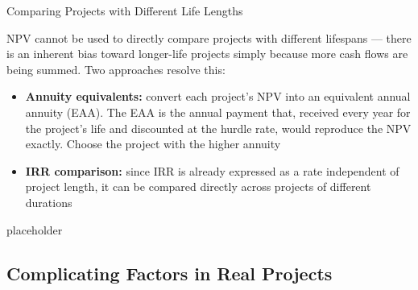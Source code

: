 \documentclass[10pt]{article}
\begin{document}
    \begin{core}{Comparing Projects with Different Life Lengths}

      NPV cannot be used to directly compare projects with different lifespans — there is an inherent bias toward longer-life projects simply because more cash flows are being summed. Two approaches resolve this:

      \begin{itemize}

        \item \textbf{Annuity equivalents:} convert each project's NPV into an equivalent annual annuity (EAA). The EAA is the annual payment that, received every year for the project's life and discounted at the hurdle rate, would reproduce the NPV exactly. Choose the project with the higher annuity

        \item \textbf{IRR comparison:} since IRR is already expressed as a rate independent of project length, it can be compared directly across projects of different durations

      \end{itemize}


    \end{core}

    \begin{core}{placeholder}


    \end{core}

  \subsection{Complicating Factors in Real Projects}
\end{document}
